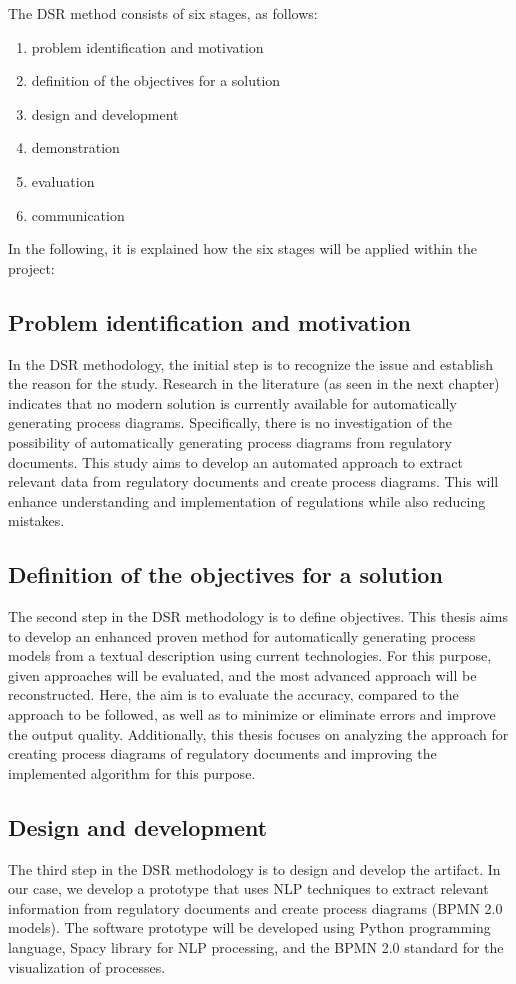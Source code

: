 The DSR method consists of six stages, as follows: \begin{enumerate}
\item	problem identification and motivation
\item	definition of the objectives for a solution
\item	design and development 
\item	demonstration 
\item	evaluation
\item	communication
\end{enumerate}
In the following, it is explained how the six stages will be applied within the project:

\subsection{Problem identification and motivation}
In the DSR methodology, the initial step is to recognize the issue and establish the reason for the study. Research in the literature (as seen in the next chapter) indicates that no modern solution is currently available for automatically generating process diagrams. Specifically, there is no investigation of the possibility of automatically generating process diagrams from regulatory documents. This study aims to develop an automated approach to extract relevant data from regulatory documents and create process diagrams. This will enhance understanding and implementation of regulations while also reducing mistakes.

\subsection{Definition of the objectives for a solution}
The second step in the DSR methodology is to define objectives. This thesis aims to develop an enhanced proven method for automatically generating process models from a textual description using current technologies. For this purpose, given approaches will be evaluated, and the most advanced approach will be reconstructed. Here, the aim is to evaluate the accuracy, compared to the approach to be followed, as well as to minimize or eliminate errors and improve the output quality. Additionally, this thesis focuses on analyzing the approach for creating process diagrams of regulatory documents and improving the implemented algorithm for this purpose.

\subsection{Design and development}
The third step in the DSR methodology is to design and develop the artifact. In our case, we develop a prototype that uses NLP techniques to extract relevant information from regulatory documents and create process diagrams (BPMN 2.0 models). The software prototype will be developed using Python programming language, Spacy library for NLP processing, and the BPMN 2.0 standard for the visualization of processes.

